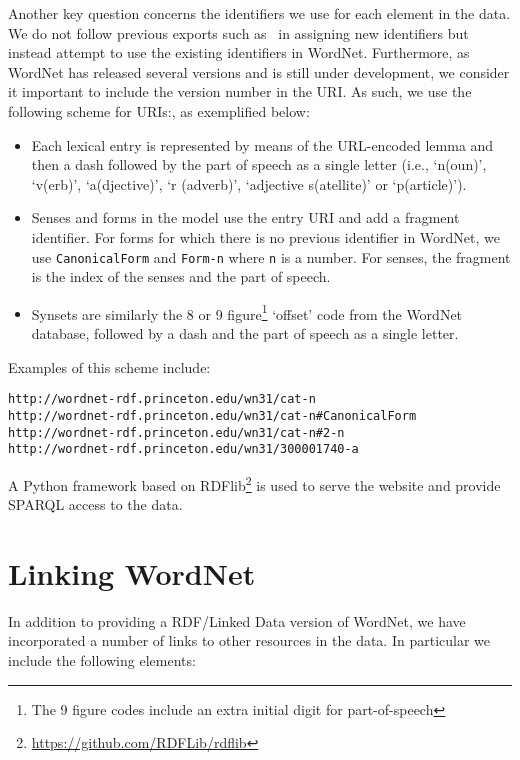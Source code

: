 \documentclass[10pt, a4paper]{article}
\begin{document}
Another key question concerns the identifiers we use for each element in the data.
We do not follow previous exports such as~\cite{van2006conversion} in assigning new identifiers
but instead attempt to use the existing identifiers in WordNet. Furthermore, as
WordNet has released several versions and is still under development, we consider it 
important to include the version number in the URI. As such, we use the
following scheme for URIs:, as exemplified below:

\begin{itemize}
  \item Each lexical entry is represented by means of the URL-encoded lemma and
    then a dash followed by the part of speech as a single letter (i.e., `n(oun)',
    `v(erb)', `a(djective)', `r (adverb)', `adjective s(atellite)' or `p(article)').
  \item Senses and forms in the model use the entry URI and add a fragment
    identifier. For forms for which there is no previous identifier in WordNet, we
    use {\tt CanonicalForm} and {\tt Form-n} where {\tt n} is a number.
    For senses, the fragment is the index of the senses and the part of
    speech.
  \item Synsets are similarly the 8 or 9 figure\footnote{The 9 figure codes
      include an extra initial digit for part-of-speech} `offset' code from the WordNet
    database, followed by a dash and the part of speech as a single letter.
\end{itemize}

Examples of this scheme include:

{\scriptsize
\begin{verbatim}
http://wordnet-rdf.princeton.edu/wn31/cat-n
http://wordnet-rdf.princeton.edu/wn31/cat-n#CanonicalForm
http://wordnet-rdf.princeton.edu/wn31/cat-n#2-n
http://wordnet-rdf.princeton.edu/wn31/300001740-a
\end{verbatim}}


A Python framework based on RDFlib\footnote{\url{https://github.com/RDFLib/rdflib}} is used to serve the website and
provide SPARQL access to the data.

\section{Linking WordNet}

In addition to providing a RDF/Linked Data version of WordNet, we have incorporated a number of links to other resources in the data. In particular
we include the following elements:
\end{document}
